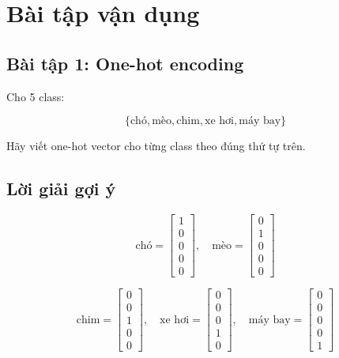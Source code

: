 \documentclass[12pt,a4paper]{report}
\begin{document}
\chapter{Bài tập vận dụng}

\section*{Bài tập 1: One-hot encoding}

Cho 5 class:

\[
    \{\text{chó}, \text{mèo}, \text{chim}, \text{xe hơi}, \text{máy bay}\}
\]

Hãy viết one-hot vector cho từng class theo đúng thứ tự trên.

\section*{Lời giải gợi ý}

\[
    \text{chó} =
    \begin{bmatrix}
    1\\0\\0\\0\\0
    \end{bmatrix},
    \quad
    \text{mèo} =
    \begin{bmatrix}
    0\\1\\0\\0\\0
    \end{bmatrix}
\]

\[
    \text{chim} =
    \begin{bmatrix}
    0\\0\\1\\0\\0
    \end{bmatrix},
    \quad
    \text{xe hơi} =
    \begin{bmatrix}
    0\\0\\0\\1\\0
    \end{bmatrix},
    \quad
    \text{máy bay} =
    \begin{bmatrix}
    0\\0\\0\\0\\1
    \end{bmatrix}
\]
\end{document}
